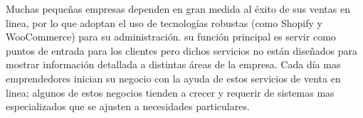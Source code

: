 \setcounter{page}{1}  %
\thispagestyle{empty}  %

Muchas pequeñas empresas dependen en gran medida al éxito de sus ventas en linea, por lo que adoptan el uso de tecnologías robustas (como Shopify y WooCommerce) para su administración. su función principal es servir como puntos de entrada para los clientes pero dichos servicios no están diseñados para mostrar información detallada a distintas áreas de la empresa. Cada día mas emprendedores inician su negocio con la ayuda de estos servicios de venta en linea; algunos de estos negocios tienden a crecer y requerir de sistemas mas especializados que se ajusten a necesidades particulares.